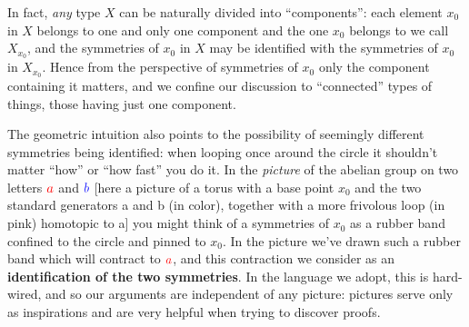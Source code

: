In fact, \emph{any} type $X$ can be naturally divided into ``components'': each element $x_0$ in $X$ belongs to one and only one component and the one $x_0$ belongs to we call $X_{x_0}$, and the symmetries of $x_0$ in $X$ may be identified with the symmetries of $x_0$ in $X_{x_0}$. Hence from the perspective of symmetries of $x_0$ only the component containing it matters, and we confine our discussion to ``connected'' types of things, \ie those having just one component.

The geometric intuition also points to the possibility of seemingly different symmetries being identified: when looping once around the circle it shouldn't matter ``how'' or ``how fast'' you do it. In the \emph{picture} of the abelian group on two letters ${\color{red}a}$ and ${\color{blue}b}$
[here a picture of a torus with a base point $x_0$ and the two standard generators a and b (in color), together with a more frivolous loop (in pink) homotopic to a]
you might think of a symmetries of $x_0$ as a {\color{pink}rubber band} confined to the circle and pinned to $x_0$. In the picture we've drawn such a {\color{pink}rubber band} which will contract to ${\color{red}a}$, and this contraction we consider as an \textbf{identification of the two symmetries}.
In the language we adopt, this is hard-wired, and so our arguments are independent of any picture: pictures serve only as inspirations and are very helpful when trying to discover proofs.


